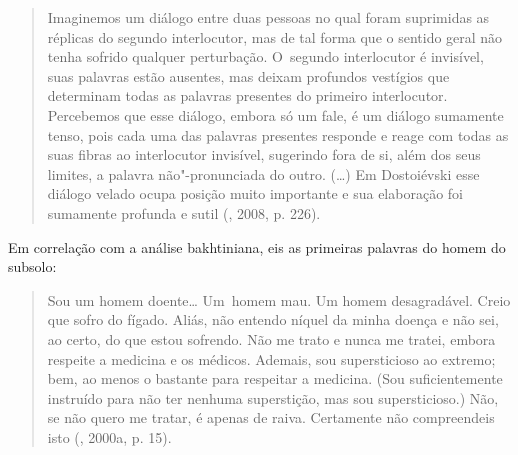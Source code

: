 \begin{quote}
Imaginemos um diálogo entre duas pessoas no qual foram suprimidas as
réplicas do segundo interlocutor, mas de tal forma que o sentido geral
não tenha sofrido qualquer perturbação. O~segundo interlocutor é
invisível, suas palavras estão ausentes, mas deixam profundos vestígios
que determinam todas as palavras presentes do primeiro interlocutor.
Percebemos que esse diálogo, embora só um fale, é um diálogo sumamente
tenso, pois cada uma das palavras presentes responde e reage com todas
as suas fibras ao interlocutor invisível, sugerindo fora de si, além dos
seus limites, a palavra não"-pronunciada do outro. (\ldots) Em Dostoiévski
esse diálogo velado ocupa posição muito importante e sua elaboração foi
sumamente profunda e sutil (, 2008, p. 226).
\end{quote}

Em correlação com a análise bakhtiniana, eis as primeiras palavras do
homem do subsolo:

\begin{quote}
Sou um homem doente\ldots %
Um~homem mau. Um homem desagradável. Creio que
sofro do fígado. Aliás, não entendo níquel da minha doença e não sei, ao
certo, do que estou sofrendo. Não me trato e nunca me tratei, embora
respeite a medicina e os médicos. Ademais, sou supersticioso ao extremo;
bem, ao menos o bastante para respeitar a medicina. (Sou suficientemente
instruído para não ter nenhuma superstição, mas sou supersticioso.) Não,
se não quero me tratar, é apenas de raiva. Certamente não compreendeis
isto (, 2000a, p. 15).
\end{quote}

